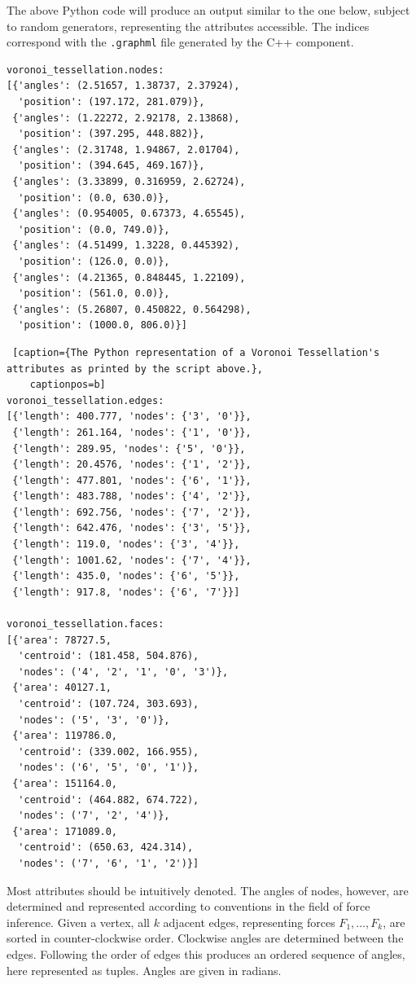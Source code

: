 \documentclass[a4paper]{article}
\begin{document}
The above Python code will produce an output similar to the one below, subject to random generators,
representing the attributes accessible. The indices correspond with the \texttt{.graphml} file generated
by the C++ component.

\lstset{style=output}
\begin{lstlisting}
voronoi_tessellation.nodes:
[{'angles': (2.51657, 1.38737, 2.37924),
  'position': (197.172, 281.079)},
 {'angles': (1.22272, 2.92178, 2.13868),
  'position': (397.295, 448.882)},
 {'angles': (2.31748, 1.94867, 2.01704),
  'position': (394.645, 469.167)},
 {'angles': (3.33899, 0.316959, 2.62724),
  'position': (0.0, 630.0)},
 {'angles': (0.954005, 0.67373, 4.65545),
  'position': (0.0, 749.0)},
 {'angles': (4.51499, 1.3228, 0.445392),
  'position': (126.0, 0.0)},
 {'angles': (4.21365, 0.848445, 1.22109),
  'position': (561.0, 0.0)},
 {'angles': (5.26807, 0.450822, 0.564298),
  'position': (1000.0, 806.0)}]

\end{lstlisting}
\pagebreak
\begin{lstlisting} [caption={The Python representation of a Voronoi Tessellation's attributes as printed by the script above.}, 
	captionpos=b]
voronoi_tessellation.edges:
[{'length': 400.777, 'nodes': {'3', '0'}},
 {'length': 261.164, 'nodes': {'1', '0'}},
 {'length': 289.95, 'nodes': {'5', '0'}},
 {'length': 20.4576, 'nodes': {'1', '2'}},
 {'length': 477.801, 'nodes': {'6', '1'}},
 {'length': 483.788, 'nodes': {'4', '2'}},
 {'length': 692.756, 'nodes': {'7', '2'}},
 {'length': 642.476, 'nodes': {'3', '5'}},
 {'length': 119.0, 'nodes': {'3', '4'}},
 {'length': 1001.62, 'nodes': {'7', '4'}},
 {'length': 435.0, 'nodes': {'6', '5'}},
 {'length': 917.8, 'nodes': {'6', '7'}}]

voronoi_tessellation.faces:
[{'area': 78727.5,
  'centroid': (181.458, 504.876),
  'nodes': ('4', '2', '1', '0', '3')},
 {'area': 40127.1,
  'centroid': (107.724, 303.693),
  'nodes': ('5', '3', '0')},
 {'area': 119786.0,
  'centroid': (339.002, 166.955),
  'nodes': ('6', '5', '0', '1')},
 {'area': 151164.0,
  'centroid': (464.882, 674.722),
  'nodes': ('7', '2', '4')},
 {'area': 171089.0,
  'centroid': (650.63, 424.314),
  'nodes': ('7', '6', '1', '2')}]
\end{lstlisting}

Most attributes should be intuitively denoted. The angles of nodes, however, are determined and represented according to
conventions in the field of force inference. Given a vertex, all \(k\) adjacent edges, representing forces \(F_1, \dots, F_k\),
are sorted in counter-clockwise order. Clockwise angles are determined between the edges. Following the order of edges this
produces an ordered sequence of angles, here represented as tuples. Angles are given in radians.
\end{document}
